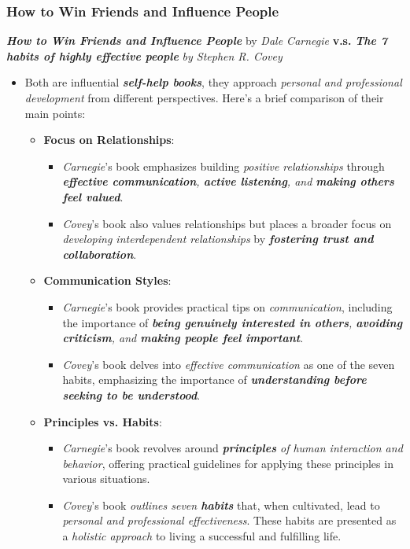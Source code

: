 \documentclass[11pt]{article}
\begin{document}
\subsubsection{How to Win Friends and Influence People}
\emph{\textbf{How to Win Friends and Influence People}} by \emph{Dale Carnegie} \textbf{v.s.} \emph{\textbf{The 7 habits of highly effective people}} \emph{by Stephen R. Covey}
\begin{itemize}
\item Both are influential \emph{\textbf{self-help books}}, they approach \emph{personal and professional development} from different perspectives. Here's a brief comparison of their main points:

\begin{itemize}
\item \textbf{Focus on Relationships}:
\begin{itemize}
\item \emph{Carnegie}'s book emphasizes building \emph{positive relationships} through \emph{\textbf{effective communication}, \textbf{active listening}, and \textbf{making others feel valued}}.
\item \emph{Covey}'s book also values relationships but places a broader focus on \emph{developing interdependent relationships} by \emph{\textbf{fostering trust and collaboration}}.
\end{itemize}

\item \textbf{Communication Styles}:
\begin{itemize}
\item \emph{Carnegie}'s book provides practical tips on \emph{communication}, including the importance of \emph{\textbf{being genuinely interested in others}, \textbf{avoiding criticism}, and \textbf{making people feel important}}.
\item \emph{Covey}'s book delves into \emph{effective communication} as one of the seven habits, emphasizing the importance of \emph{\textbf{understanding before seeking to be understood}}.
\end{itemize}

\item \textbf{Principles vs. Habits}:
\begin{itemize}
\item \emph{Carnegie}'s book revolves around \emph{\textbf{principles} of human interaction and behavior}, offering practical guidelines for applying these principles in various situations.
\item \emph{Covey}'s book \emph{outlines seven \textbf{habits}} that, when cultivated, lead to \emph{personal and professional effectiveness}. These habits are presented as a \emph{holistic approach} to living a successful and fulfilling life.
\end{itemize}


\end{itemize}
\end{itemize}
\end{document}
